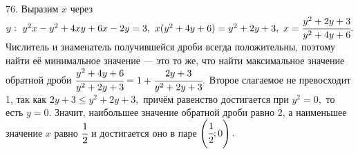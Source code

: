 76. Выразим $x$ через $y:\ y^2x-y^2+4xy+6x-2y=3,\ x(y^2+4y+6)=y^2+2y+3,\ x=\cfrac{y^2+2y+3}{y^2+4y+6}.$ Числитель и знаменатель получившейся дроби всегда положительны, поэтому найти её минимальное значение --- это то же, что найти максимальное значение обратной дроби $\cfrac{y^2+4y+6}{y^2+2y+3}=1+\cfrac{2y+3}{y^2+2y+3}.$ Второе слагаемое не превосходит 1, так как $2y+3\leqslant y^2+2y+3,$ причём равенство достигается при $y^2=0,$ то есть $y=0.$ Значит, наибольшее значение обратной дроби равно 2, а наименьшее значение $x$ равно $\cfrac{1}{2}$ и достигается оно в паре $\left(\cfrac{1}{2};0\right).$\\
